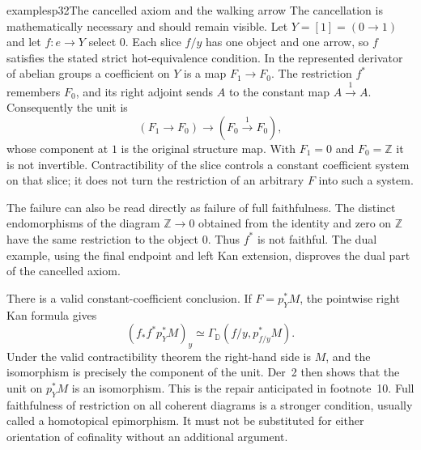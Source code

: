 \begin{dcomment}{examples}{p32}{The cancelled axiom and the walking arrow}
The cancellation is mathematically necessary and should remain visible.
Let $Y=[1]=(0\to1)$ and let $f:e\to Y$ select $0$. Each slice $f/y$
has one object and one arrow, so $f$ satisfies the stated strict
hot-equivalence condition. In the represented derivator of abelian
groups a coefficient on $Y$ is a map $F_1\to F_0$. The restriction
$f^*$ remembers $F_0$, and its right adjoint sends $A$ to the constant
map $A\xrightarrow{1}A$. Consequently the unit is
\[
 (F_1\longrightarrow F_0)\longrightarrow
 (F_0\xrightarrow{1}F_0),
\]
whose component at $1$ is the original structure map. With
$F_1=0$ and $F_0=\mathbb Z$ it is not invertible. Contractibility of
the slice controls a constant coefficient system on that slice; it
does not turn the restriction of an arbitrary $F$ into such a system.

The failure can also be read directly as failure of full faithfulness.
The distinct endomorphisms of the diagram
$\mathbb Z\to0$ obtained from the identity and zero on $\mathbb Z$
have the same restriction to the object $0$. Thus $f^*$ is not faithful.
The dual example, using the final endpoint and left Kan extension,
disproves the dual part of the cancelled axiom.

There is a valid constant-coefficient conclusion. If
$F=p_Y^*M$, the pointwise right Kan formula gives
\[
 (f_*f^*p_Y^*M)_y
 \simeq\Gamma_{\mathbb D}(f/y,p_{f/y}^*M).
\]
Under the valid contractibility theorem the right-hand side is $M$, and
the isomorphism is precisely the component of the unit. Der~2 then
shows that the unit on $p_Y^*M$ is an isomorphism. This is the repair
anticipated in footnote~10. Full faithfulness of restriction on all
coherent diagrams is a stronger condition, usually called a
homotopical epimorphism. It must not be substituted for either
orientation of cofinality without an additional argument.
\end{dcomment}

